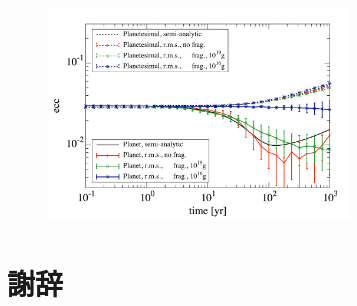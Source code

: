 \documentclass[a4paper,10pt,oneside,twocolumn,notitlepage,final]{jarticle}
\begin{document}
\begin{figure}[H]
 \centering
 \includegraphics[width=8cm]{./image/Ntr3E3_t1E3_dtlog_Mtot3E-5_ecc3E-2_noacc_ecc_wf_wof.pdf}
 \caption{\label{fig:ecc3_time}}
\end{figure}



\section*{謝辞}

\small


\end{document}
